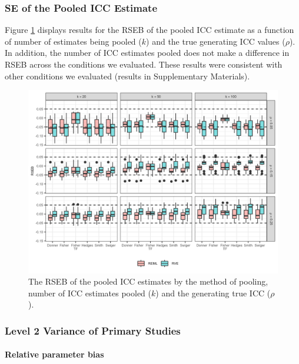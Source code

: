
\subsubsection{SE of the Pooled ICC Estimate}




Figure \ref{fig:RPBkse_k} displays results for the RSEB of the pooled ICC estimate as a function of number of estimates being pooled ($k$) and the true generating ICC values ($\rho$). In addition, the number of ICC estimates pooled does not make a difference in RSEB across the conditions we evaluated. These results were consistent with other conditions we evaluated  (results in Supplementary Materials). 



\begin{figure}[h!]
\centerline{\includegraphics{Main/RSE_numICC.png}}
    \caption{The RSEB of the pooled ICC estimates by the method of pooling, number of ICC estimates pooled ($k$) and the generating true ICC ($\rho$). \label{fig:RPBkse_k}}
\end{figure}






\subsubsection{ Level 2 Variance of Primary Studies}


\paragraph{Relative parameter bias}

